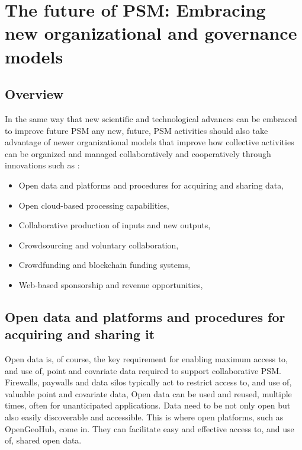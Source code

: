 \documentclass[graybox,natbib,nospthms,UStrade]{svmono}
\begin{document}
\hypertarget{the-future-of-psm-embracing-new-organizational-and-governance-models}{%
\section{The future of PSM: Embracing new organizational and governance models}\label{the-future-of-psm-embracing-new-organizational-and-governance-models}}

\hypertarget{overview-1}{%
\subsection{Overview}\label{overview-1}}

In the same way that new scientific and technological advances can be
embraced to improve future PSM any new, future, PSM activities should
also take advantage of newer organizational models that improve how
collective activities can be organized and managed collaboratively and
cooperatively through innovations such as \citep{Hengl2018OGH}:

\begin{itemize}
\item
  Open data and platforms and procedures for acquiring and sharing data,
\item
  Open cloud-based processing capabilities,
\item
  Collaborative production of inputs and new outputs,
\item
  Crowdsourcing and voluntary collaboration,
\item
  Crowdfunding and blockchain funding systems,
\item
  Web-based sponsorship and revenue opportunities,
\end{itemize}

\hypertarget{open-data-and-platforms-and-procedures-for-acquiring-and-sharing-it}{%
\subsection{Open data and platforms and procedures for acquiring and sharing it}\label{open-data-and-platforms-and-procedures-for-acquiring-and-sharing-it}}

Open data is, of course, the key requirement for enabling maximum access
to, and use of, point and covariate data required to support
collaborative PSM. Firewalls, paywalls and data silos typically act to
restrict access to, and use of, valuable point and covariate data, Open
data can be used and reused, multiple times, often for unanticipated
applications. Data need to be not only open but also easily discoverable
and accessible. This is where open platforms, such as OpenGeoHub, come
in. They can facilitate easy and effective access to, and use of, shared
open data.
\end{document}
